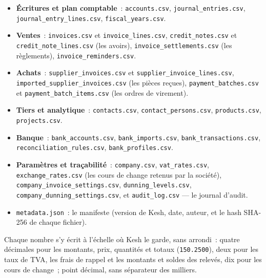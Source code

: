 \documentclass[a4paper,11pt,oneside]{article}
\begin{document}
\begin{itemize}
    \item \textbf{Écritures et plan comptable}~: \texttt{accounts.csv}, \texttt{journal\_entries.csv},
          \texttt{journal\_entry\_lines.csv}, \texttt{fiscal\_years.csv}.
    \item \textbf{Ventes}~: \texttt{invoices.csv} et \texttt{invoice\_lines.csv},
          \texttt{credit\_notes.csv} et \texttt{credit\_note\_lines.csv} (les avoirs),
          \texttt{invoice\_settlements.csv} (les règlements), \texttt{invoice\_reminders.csv}.
    \item \textbf{Achats}~: \texttt{supplier\_invoices.csv} et \texttt{supplier\_invoice\_lines.csv},
          \texttt{imported\_supplier\_invoices.csv} (les pièces reçues),
          \texttt{payment\_batches.csv} et \texttt{payment\_batch\_items.csv} (les ordres de virement).
    \item \textbf{Tiers et analytique}~: \texttt{contacts.csv}, \texttt{contact\_persons.csv},
          \texttt{products.csv}, \texttt{projects.csv}.
    \item \textbf{Banque}~: \texttt{bank\_accounts.csv}, \texttt{bank\_imports.csv},
          \texttt{bank\_transactions.csv}, \texttt{reconciliation\_rules.csv}, \texttt{bank\_profiles.csv}.
    \item \textbf{Paramètres et traçabilité}~: \texttt{company.csv}, \texttt{vat\_rates.csv},
          \texttt{exchange\_rates.csv} (les cours de change retenus par la société),
          \texttt{company\_invoice\_settings.csv}, \texttt{dunning\_levels.csv},
          \texttt{company\_dunning\_settings.csv}, et \texttt{audit\_log.csv} --- le journal d'audit.
    \item \texttt{metadata.json}~: le manifeste (version de Kesh, date, auteur, et le hash
          SHA-256 de chaque fichier).
\end{itemize}

Chaque nombre s'y écrit à l'échelle où Kesh le garde, sans arrondi~: quatre décimales pour les
montants, prix, quantités et totaux (\texttt{150.2500}), deux pour les taux de TVA, les frais de
rappel et les montants et soldes des relevés, dix pour les cours de change~; point décimal, sans
séparateur des milliers.
\end{document}
